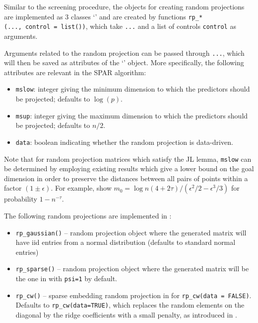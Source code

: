 \documentclass[
  article]{jss}
\newcommand{\class}[1]{`\code{#1}'}
\begin{document}
Similar to the screening procedure, the objects for creating random
projections are implemented as 3 classes
\class{randomprojection} and are created by functions
\texttt{rp\_*(...,\ control\ =\ list())}, which take \texttt{...} and a
list of controls \texttt{control} as arguments.

Arguments related to the random projection can be passed through
\texttt{...}, which will then be saved as attributes of the
\class{randomprojection} object. More specifically, the following
attributes are relevant in the SPAR algorithm:

\begin{itemize}
\item
  \texttt{mslow}: integer giving the minimum dimension to which the
  predictors should be projected; defaults to \(\log(p)\).
\item
  \texttt{msup}: integer giving the maximum dimension to which the
  predictors should be projected; defaults to \(n/2\).
\item
  \texttt{data}: boolean indicating whether the random projection is
  data-driven.
\end{itemize}

Note that for random projection matrices which satisfy the JL lemma,
\texttt{mslow} can be determined by employing existing results which
give a lower bound on the goal dimension in order to preserve the
distances between all pairs of points within a factor
\((1 \pm \epsilon)\). For example, \citet{ACHLIOPTAS2003JL} show
\(m_0 = \log n(4 + 2\tau)/(\epsilon^2/2 − \epsilon^3/3)\) for
probability \(1 − n^{-\tau}\).

The following random projections are implemented in :

\begin{itemize}
\item
  \texttt{rp\_gaussian()} -- random projection object where the
  generated matrix will have iid entries from a normal distribution
  (defaults to standard normal entries)
\item
  \texttt{rp\_sparse()} -- random projection object where the generated
  matrix will be the one in \citep{ACHLIOPTAS2003JL} with \texttt{psi=1}
  by default.
\item
  \texttt{rp\_cw()} -- sparse embedding random projection in
  \citep{Clarkson2013LowRankApprox} for \texttt{rp\_cw(data\ =\ FALSE)}.
  Defaults to \texttt{rp\_cw(data=TRUE)}, which replaces the random
  elements on the diagonal by the ridge coefficients with a small
  penalty, as introduced in \citet{parzer2024glms}.
\end{itemize}
\end{document}
